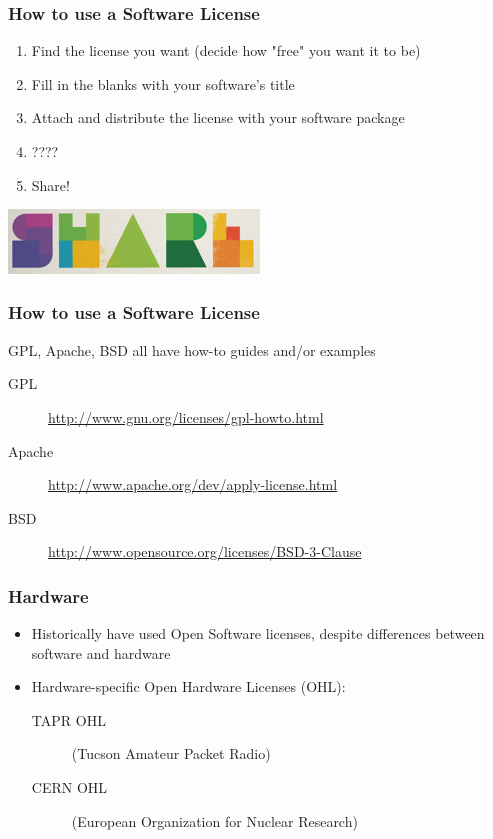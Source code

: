 \documentclass{beamer}
\begin{document}
\begin{frame}
  \frametitle{How to use a Software License}
  \begin{enumerate}
  \item Find the license you want (decide how "free" you want it to be)
  \item Fill in the blanks with your software's title
  \item Attach and distribute the license with your software package
  \item ????
    \pause
  \item Share!
  \end{enumerate}
  \begin{center} 
    \includegraphics[width=0.5\textwidth]{../img/share} 
  \end{center}
\end{frame}

\begin{frame}
  \frametitle{How to use a Software License}
  GPL, Apache, BSD all have how-to guides and/or examples
  \begin{description}
  \item[GPL] \href{http://www.gnu.org/licenses/gpl-howto.html}{http://www.gnu.org/licenses/gpl-howto.html}
  \item[Apache] \href{http://www.apache.org/dev/apply-license.html}{http://www.apache.org/dev/apply-license.html}
  \item[BSD] \href{http://www.opensource.org/licenses/BSD-3-Clause}{http://www.opensource.org/licenses/BSD-3-Clause}
  \end{description}
\end{frame}

\begin{frame}
  \frametitle{Hardware}
  \begin{itemize}
  \item Historically have used Open Software licenses, despite differences between software and hardware
  \item Hardware-specific Open Hardware Licenses (OHL):
    \begin{description}
    \item[TAPR OHL] (Tucson Amateur Packet Radio)
    \item[CERN OHL] (European Organization for Nuclear Research)
    \end{description}
  \end{itemize}
\end{frame}
\end{document}
